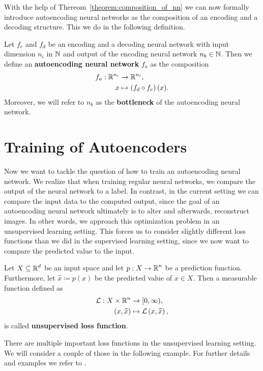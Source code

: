 With the help of Thereom~\ref{theorem:composition_of_nn} we can now formally introduce autoencoding neural networks as the composition of an encoding and a decoding structure. This we do in the following definition.

\begin{definition}\label{def_autoencoder}
Let $f_e$ and $f_d$ be an encoding and a decoding neural network with input dimension $n_i$ in $\operatorname{\mathbb{N}}$ and output of the encoding neural network $n_b \in \operatorname{\mathbb{N}}$.
Then we define an \textbf{autoencoding neural network} $f_a$ as the composition
\begin{align*}
f_a: \operatorname{\mathbb{R}}^{n_i} &\to \operatorname{\mathbb{R}}^{n_i},\\
x &\mapsto \left(f_d \circ f_e \right)(x).
\end{align*}
Moreover, we will refer to $n_b$ as the \textbf{bottleneck} of the autoencoding neural network.
\end{definition}


\section{Training of Autoencoders}
Now we want to tackle the question of how to train an autoencoding neural network. We realize that when training regular neural networks, we compare the output of the neural network to a label. In contrast, in the current setting we can compare the input data to the computed output, since the goal of an autoencoding neural network ultimately is to alter and afterwards, reconstruct images. In other words, we approach this optimization problem in an unsupervised learning setting. This forces us to consider slightly different loss functions than we did in the supervised learning setting, since we now want to compare the predicted value to the input.


\begin{definition}
Let $X\subseteq \operatorname{\mathbb{R}}^{d}$ be an input space and let $p:X\to \operatorname{\mathbb{R}}^{n}$ be a prediction function. Furthermore, let $\hat{x}\coloneqq p(x)$ be the predicted value of $x\in X$. Then a measurable function defined as
\begin{align*}
\operatorname{\mathcal{L}}:X \times \operatorname{\mathbb{R}}^{n} &\to [0, \infty),\\
\left(x, \widehat{x}\right) &\mapsto \operatorname{\mathcal{L}}\left(x, \widehat{x}\right),
\end{align*}
is called \textbf{unsupervised loss function}.
\end{definition}


There are multiple important loss functions in the unsupervised learning setting. We will consider a couple of those in the following example. For further details and examples we refer to \cite{foster2022generative}.


